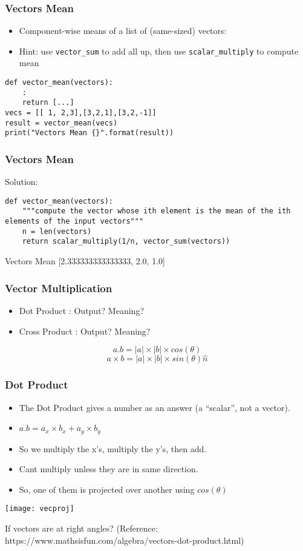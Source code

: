 \begin{frame}[fragile]\frametitle{Vectors Mean}
\begin{itemize}
\item Component-wise means of a list of (same-sized) vectors:
\item Hint: use \lstinline|vector_sum| to add all up, then use \lstinline|scalar_multiply| to compute mean
\end{itemize}
\begin{lstlisting}
def vector_mean(vectors):
	:
	return [...]
vecs = [[ 1, 2,3],[3,2,1],[3,2,-1]]
result = vector_mean(vecs)
print("Vectors Mean {}".format(result))
\end{lstlisting}
\end{frame}

\begin{frame}[fragile]\frametitle{Vectors Mean}
Solution:
\begin{lstlisting}
def vector_mean(vectors):
    """compute the vector whose ith element is the mean of the ith elements of the input vectors"""
    n = len(vectors)
    return scalar_multiply(1/n, vector_sum(vectors))
\end{lstlisting}
Vectors Mean [2.333333333333333, 2.0, 1.0]
\end{frame}

\begin{frame}[fragile]\frametitle{Vector Multiplication}
\begin{itemize}
\item  Dot Product : Output? Meaning?
\item  Cross Product : Output? Meaning?
\end{itemize}
$$a.b = |a| \times |b| \times cos(\theta)$$
$$a \times b = |a| \times |b| \times sin(\theta)\hat{n}$$
\end{frame}


\begin{frame}[fragile]\frametitle{Dot Product}
\begin{itemize}
\item The Dot Product gives a number as an answer (a ``scalar'', not a vector). 
\item $a.b = a_x \times b_x + a_y \times b_y$
\item So we multiply the x's, multiply the y's, then add.
\item Cant multiply unless they are in same direction.
\item So, one of them is projected over another using $cos(\theta)$
\end{itemize}
\begin{center}
\texttt{[image: vecproj]}
\end{center}
If vectors are at right angles?
\tiny{(Reference: https://www.mathsisfun.com/algebra/vectors-dot-product.html)}
\end{frame}


